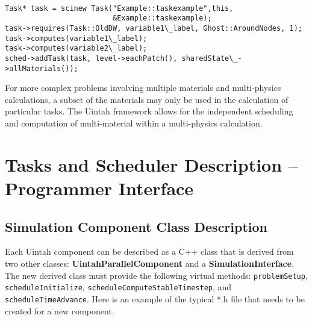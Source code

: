 \documentclass[12pt]{report}
\begin{document}
\begin{verbatim}

Task* task = scinew Task("Example::taskexample",this,
                         &Example::taskexample);
task->requires(Task::OldDW, variable1\_label, Ghost::AroundNodes, 1);
task->computes(variable1\_label);
task->computes(variable2\_label);
sched->addTask(task, level->eachPatch(), sharedState\_->allMaterials());

\end{verbatim}

For more complex problems involving multiple materials and
multi-physics calculations, a subset of the materials may only be used
in the calculation of particular tasks.  The Uintah framework allows
for the independent scheduling and computation of multi-material
within a multi-physics calculation.

\section{Tasks and Scheduler Description -- Programmer Interface}

\subsection{Simulation Component Class Description}

Each Uintah component can be described as a C++ class that is derived
from two other classes: \textbf{UintahParallelComponent} and a
\textbf{SimulationInterface}. The new derived class must provide the
following virtual methods: \texttt{problemSetup},
\texttt{scheduleInitialize}, \texttt{scheduleComputeStableTimestep},
and \texttt{scheduleTimeAdvance}.  Here is an example of the typical
*.h file that needs to be created for a new component.
\end{document}
